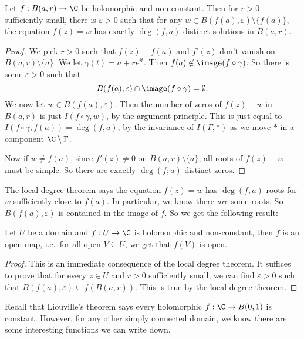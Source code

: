 \documentclass[a4paper]{article}
\begin{document}
\begin{prop}
  Let $f: B(a, r) \to \C$ be holomorphic and non-constant. Then for $r > 0$ sufficiently small, there is $\varepsilon > 0$ such that for any $w \in B(f(a), \varepsilon) \setminus \{f(a)\}$, the equation $f(z) = w$ has exactly $\deg(f, a)$ distinct solutions in $B(a, r)$.
\end{prop}

\begin{proof}
  We pick $r > 0$ such that $f(z) - f(a)$ and $f'(z)$ don't vanish on $B(a, r) \setminus \{a\}$. We let $\gamma(t) = a + re^{it}$. Then $f(a) \not\in \image(f \circ \gamma)$. So there is some $\varepsilon > 0$ such that
  \[
    B(f(a), \varepsilon) \cap \image(f \circ \gamma) = \emptyset.
  \]
  We now let $w \in B(f(a), \varepsilon)$. Then the number of zeros of $f(z) - w$ in $B(a, r)$ is just $I(f \circ \gamma, w)$, by the argument principle. This is just equal to $I(f \circ \gamma, f(a)) = \deg(f, a)$, by the invariance of $I(\Gamma, *)$ as we move $*$ in a component $\C \setminus \Gamma$.

  Now if $w \not= f(a)$, since $f'(z) \not= 0$ on $B(a, r)\setminus \{a\}$, all roots of $f(z) - w$ must be simple. So there are exactly $\deg (f; a)$ distinct zeros.
\end{proof}

The local degree theorem says the equation $f(z) = w$ has $\deg(f, a)$ roots for $w$ sufficiently close to $f(a)$. In particular, we know there \emph{are} some roots. So $B(f(a), \varepsilon)$ is contained in the image of $f$. So we get the following result:

\begin{cor}
  Let $U$ be a domain and $f: U \to \C$ is holomorphic and non-constant, then $f$ is an open map, i.e.\ for all open $V \subseteq U$, we get that $f(V)$ is open.
\end{cor}

\begin{proof}
  This is an immediate consequence of the local degree theorem. It suffices to prove that for every $z \in U$ and $r > 0$ sufficiently small, we can find $\varepsilon > 0$ such that $B(f(a), \varepsilon) \subseteq f(B(a, r))$. This is true by the local degree theorem.
\end{proof}

Recall that Liouville's theorem says every holomorphic $f: \C \to B(0, 1)$ is constant. However, for any other simply connected domain, we know there are some interesting functions we can write down.
\end{document}
